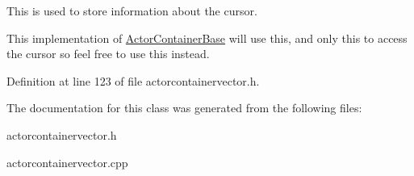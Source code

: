 This is used to store information about the cursor. 

This implementation of \hyperlink{classphys_1_1ActorContainerBase}{ActorContainerBase} will use this, and only this to access the cursor so feel free to use this instead. 

Definition at line 123 of file actorcontainervector.h.



The documentation for this class was generated from the following files:\begin{DoxyCompactItemize}
\item 
actorcontainervector.h\item 
actorcontainervector.cpp\end{DoxyCompactItemize}

